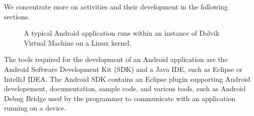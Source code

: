 We concentrate more on activities and their development in the following sections.
\begin{figure}[h!]
    \caption{A typical Android application runs within an instance of Dalvik Virtual Machine on a Linux kernel.} %
\end{figure}

The tools required for the development of an Android application are the Android Software Development Kit (SDK) and a Java IDE, such as Eclipse or IntelliJ IDEA. 
The Android SDK contains an Eclipse plugin supporting Android developement, documentation, sample code, and various tools, such as Android Debug Bridge used by the programmer to communicate with an application running on a device. 


